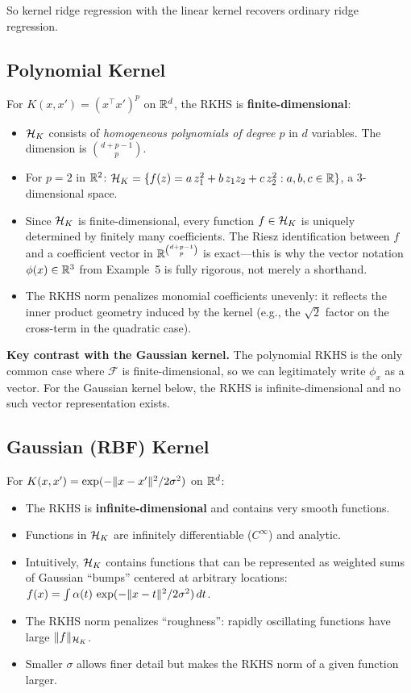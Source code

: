 \begin{notechapter}
So kernel ridge regression with the linear kernel recovers ordinary
ridge regression.

\subsection{Polynomial Kernel}

For $K(x,x') = (x^\top x')^p$ on $\mathbb{R}^d$, the RKHS is
\textbf{finite-dimensional}:
\begin{itemize}
  \item $\mathcal{H}_K$ consists of \emph{homogeneous polynomials
    of degree $p$} in $d$ variables. The dimension is
    $\binom{d+p-1}{p}$.
  \item For $p = 2$ in $\mathbb{R}^2$:
    $\mathcal{H}_K = \{f(z) = a\,z_1^2 + b\,z_1 z_2 + c\,z_2^2
    : a,b,c \in \mathbb{R}\}$, a $3$-dimensional space.
  \item Since $\mathcal{H}_K$ is finite-dimensional, every function
    $f \in \mathcal{H}_K$ is uniquely determined by finitely many
    coefficients. The Riesz identification between $f$
    and a coefficient vector in $\mathbb{R}^{\binom{d+p-1}{p}}$
    is exact---this is why the vector notation
    $\phi(x) \in \mathbb{R}^3$ from Example~5 is fully rigorous,
    not merely a shorthand.
  \item The RKHS norm penalizes monomial coefficients
    unevenly: it reflects the inner product geometry
    induced by the kernel (e.g., the $\sqrt{2}$ factor
    on the cross-term in the quadratic case).
\end{itemize}

\textbf{Key contrast with the Gaussian kernel.}
The polynomial RKHS is the only common case where
$\mathcal{F}$ is finite-dimensional, so we can
legitimately write $\phi_x$ as a vector. For the
Gaussian kernel below, the RKHS is
infinite-dimensional and no such vector
representation exists.

\subsection{Gaussian (RBF) Kernel}

For $K(x,x') = \exp(-\| x-x' \|^2/2\sigma^2)$ on $\mathbb{R}^d$:
\begin{itemize}
  \item The RKHS is \textbf{infinite-dimensional} and contains very
  smooth functions.
  \item Functions in $\mathcal{H}_K$ are infinitely differentiable ($C^\infty$)
  and analytic.
  \item Intuitively, $\mathcal{H}_K$ contains functions that can be represented as
  weighted sums of Gaussian ``bumps'' centered at arbitrary locations:
  $f(x) = \int \alpha(t)\,\exp(-\| x-t \|^2/2\sigma^2)\,dt$.
  \item The RKHS norm penalizes ``roughness'': rapidly oscillating
  functions have large $\| f \|_{\mathcal{H}_K}$.
  \item Smaller $\sigma$ allows finer detail but makes the RKHS norm of
  a given function larger.
\end{itemize}


\end{notechapter}
